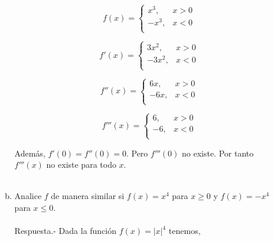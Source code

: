 \begin{enumerate}[\bfseries 1]
\begin{enumerate}[(a)]
		$$f(x)=\left\{\begin{array}{rl}
			x^3, & x> 0 \\
			-x^3, & x<0 \\
		\end{array}\right.$$

		$$f'(x)=\left\{\begin{array}{rl}
			3x^2, & x> 0 \\
			-3x^2, & x<0 \\
		\end{array}\right.$$ 

		$$f''(x)=\left\{\begin{array}{rl}
			6x, & x> 0 \\
			-6x, & x<0 \\
		\end{array}\right.$$

		$$f'''(x)=\left\{\begin{array}{rl}
			6, & x> 0 \\
			-6, & x<0 \\
		\end{array}\right.$$

		Además, $f'(0)=f''(0)=0$. Pero $f'''(0)$ no existe. Por tanto $f'''(x)$ no existe para todo $x$.\\\\


	    \item Analice $f$ de manera similar si $f(x)=x^4$ para $x\geq 0$ y $f(x)=-x^4$ para $x\leq 0.$\\\\
		Respuesta.-\; Dada la función $f(x)=|x|^4$ tenemos,


\end{enumerate}
\end{enumerate}
